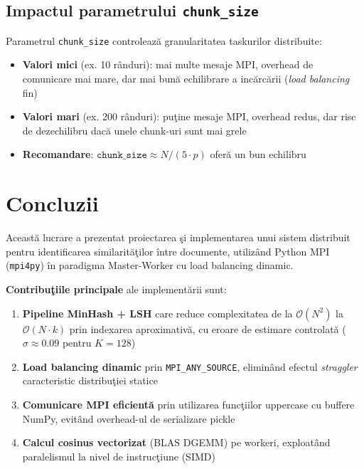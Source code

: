 \documentclass[a4paper,12pt]{report}
\begin{document}
\section{Impactul parametrului \texttt{chunk\_size}}

Parametrul \texttt{chunk\_size} controleaz\u{a} granularitatea taskurilor distribuite:
\begin{itemize}
  \item \textbf{Valori mici} (ex. 10 r\^{a}nduri): mai multe mesaje MPI, overhead de comunicare mai mare, dar mai bun\u{a} echilibrare a inc\u{a}rc\u{a}rii (\textit{load balancing} fin)
  \item \textbf{Valori mari} (ex. 200 r\^{a}nduri): pu\c{t}ine mesaje MPI, overhead redus, dar risc de dezechilibru dac\u{a} unele chunk-uri sunt mai grele
  \item \textbf{Recomandare}: $\texttt{chunk\_size} \approx N / (5 \cdot p)$ ofer\u{a} un bun echilibru
\end{itemize}

\chapter{Concluzii}

Aceast\u{a} lucrare a prezentat proiectarea \c{s}i implementarea unui sistem distribuit pentru identificarea similarit\u{a}\c{t}ilor \^{i}ntre documente, utiliz\^{a}nd Python MPI (\texttt{mpi4py}) \^{i}n paradigma Master-Worker cu load balancing dinamic.

\textbf{Contribu\c{t}iile principale} ale implement\u{a}rii sunt:
\begin{enumerate}
  \item \textbf{Pipeline MinHash + LSH} care reduce complexitatea de la $\mathcal{O}(N^2)$ la $\mathcal{O}(N \cdot k)$ prin indexarea aproximativ\u{a}, cu eroare de estimare controlat\u{a} ($\sigma \approx 0.09$ pentru $K=128$)
  \item \textbf{Load balancing dinamic} prin \texttt{MPI\_ANY\_SOURCE}, eliminând efectul \textit{straggler} caracteristic distribu\c{t}iei statice
  \item \textbf{Comunicare MPI eficient\u{a}} prin utilizarea func\c{t}iilor uppercase cu buffere NumPy, evit\^{a}nd overhead-ul de serializare pickle
  \item \textbf{Calcul cosinus vectorizat} (BLAS DGEMM) pe workeri, exploat\^{a}nd paralelismul la nivel de instruc\c{t}iune (SIMD)
\end{enumerate}
\end{document}
